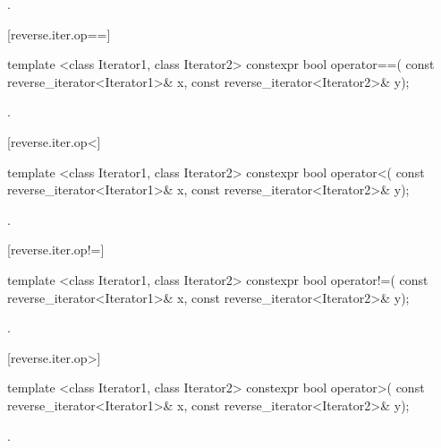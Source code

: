 \begin{itemdescr}
\pnum
\returns
{}.
\end{itemdescr}

[reverse.iter.op==]{}

%
\begin{itemdecl}
template <class Iterator1, class Iterator2>
  constexpr bool operator==(
    const reverse_iterator<Iterator1>& x,
    const reverse_iterator<Iterator2>& y);
\end{itemdecl}

\begin{itemdescr}
\pnum
\returns
{}.
\end{itemdescr}

[reverse.iter.op<]{}

%
\begin{itemdecl}
template <class Iterator1, class Iterator2>
  constexpr bool operator<(
    const reverse_iterator<Iterator1>& x,
    const reverse_iterator<Iterator2>& y);
\end{itemdecl}

\begin{itemdescr}
\pnum
\returns
{}.
\end{itemdescr}

[reverse.iter.op!=]{}

%
\begin{itemdecl}
template <class Iterator1, class Iterator2>
  constexpr bool operator!=(
    const reverse_iterator<Iterator1>& x,
    const reverse_iterator<Iterator2>& y);
\end{itemdecl}

\begin{itemdescr}
\pnum
\returns
{}.
\end{itemdescr}

[reverse.iter.op>]{}

%
\begin{itemdecl}
template <class Iterator1, class Iterator2>
  constexpr bool operator>(
    const reverse_iterator<Iterator1>& x,
    const reverse_iterator<Iterator2>& y);
\end{itemdecl}

\begin{itemdescr}
\pnum
\returns
{}.
\end{itemdescr}

